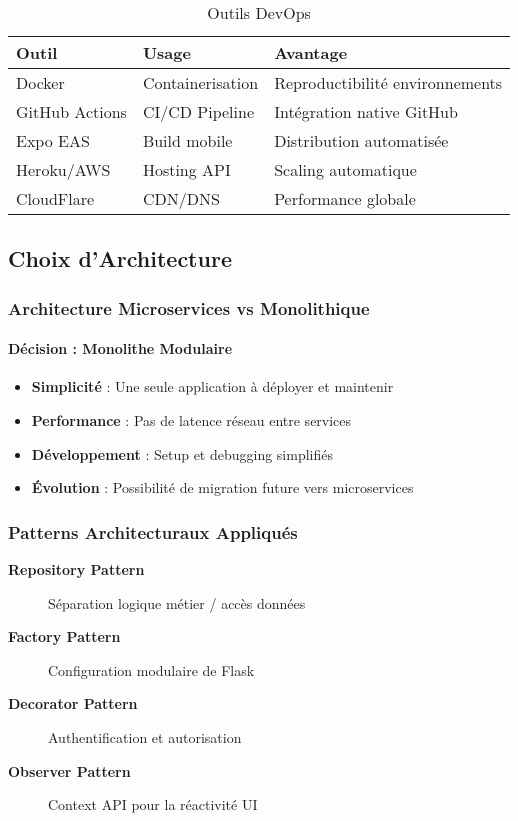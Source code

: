 \begin{table}[H]
\centering
\begin{tabular}{|l|l|l|}
\hline
\textbf{Outil} & \textbf{Usage} & \textbf{Avantage} \\
\hline
Docker & Containerisation & Reproductibilité environnements \\
GitHub Actions & CI/CD Pipeline & Intégration native GitHub \\
Expo EAS & Build mobile & Distribution automatisée \\
Heroku/AWS & Hosting API & Scaling automatique \\
CloudFlare & CDN/DNS & Performance globale \\
\hline
\end{tabular}
\caption{Outils DevOps}
\end{table}

\subsection{Choix d'Architecture}

\subsubsection{Architecture Microservices vs Monolithique}

\paragraph{Décision : Monolithe Modulaire}
\begin{itemize}
    \item \textbf{Simplicité} : Une seule application à déployer et maintenir
    \item \textbf{Performance} : Pas de latence réseau entre services
    \item \textbf{Développement} : Setup et debugging simplifiés
    \item \textbf{Évolution} : Possibilité de migration future vers microservices
\end{itemize}

\subsubsection{Patterns Architecturaux Appliqués}

\begin{description}
    \item[\textbf{Repository Pattern}] Séparation logique métier / accès données
    \item[\textbf{Factory Pattern}] Configuration modulaire de Flask
    \item[\textbf{Decorator Pattern}] Authentification et autorisation
    \item[\textbf{Observer Pattern}] Context API pour la réactivité UI
\end{description}

